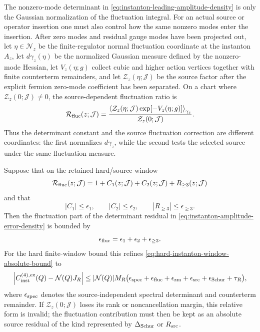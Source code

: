 \begin{controlledapproximation}
\label{ca:instanton-source-fluctuation-cumulant-bound}
The nonzero-mode determinant in
\eqref{eq:instanton-leading-amplitude-density} is only the Gaussian
normalization of the fluctuation integral.  For an actual source or operator
insertion one must also control how the same nonzero modes enter the insertion.
After zero modes and residual gauge modes have been projected out, let
\(\eta\in\mathcal N_z\) be the finite-regulator normal fluctuation coordinate
at the instanton \(A_z\), let \(d\gamma_z(\eta)\) be the normalized Gaussian
measure defined by the nonzero-mode Hessian, let \(V_z(\eta;g)\) collect cubic
and higher action vertices together with finite counterterm remainders, and let
\(\mathcal Z_z(\eta;\mathcal J)\) be the source factor after the explicit
fermion zero-mode coefficient has been separated.  On a chart where
\(\mathcal Z_z(0;\mathcal J)\ne0\), the source-dependent fluctuation ratio is
\[
  \mathcal R_{\rm fluc}(z;\mathcal J)
  =
  \frac{
    \left\langle
      \mathcal Z_z(\eta;\mathcal J)
      \exp[-V_z(\eta;g)]
    \right\rangle_{\gamma_z}
  }{
    \mathcal Z_z(0;\mathcal J)
  } .
\]
Thus the determinant constant and the source fluctuation correction are
different coordinates: the first normalizes \(d\gamma_z\), while the second
tests the selected source under the same fluctuation measure.

Suppose that on the retained hard/source window
\[
  \mathcal R_{\rm fluc}(z;\mathcal J)
  =
  1+C_1(z;\mathcal J)+C_2(z;\mathcal J)+R_{\ge3}(z;\mathcal J)
\]
and that
\[
  |C_1|\le\epsilon_1,\qquad
  |C_2|\le\epsilon_2,\qquad
  |R_{\ge3}|\le\epsilon_{\ge3}.
\]
Then the fluctuation part of the determinant residual in
\eqref{eq:instanton-amplitude-error-density} is bounded by
\[
  \epsilon_{\rm fluc}
  =
  \epsilon_1+\epsilon_2+\epsilon_{\ge3}.
\]
For the hard finite-window bound this refines
\eqref{eq:hard-instanton-window-absolute-bound} to
\[
  \left|
  C_{\rm inst}^{(4),{\rm ex}}(Q)-\mathcal N(Q)J_R
  \right|
  \le
  |\mathcal N(Q)|M_R
  \bigl(
    \epsilon_{\rm spec}
    +\epsilon_{\rm fluc}
    +\epsilon_{\rm zm}
    +\epsilon_{\rm src}
    +\epsilon_{\rm Schur}
    +\tau_R
  \bigr),
\]
where \(\epsilon_{\rm spec}\) denotes the source-independent spectral
determinant and counterterm remainder.  If
\(\mathcal Z_z(0;\mathcal J)\) loses its rank or noncancellation margin, this
relative form is invalid; the fluctuation contribution must then be kept as an
absolute source residual of the kind represented by \(\Delta_{\rm Schur}\) or
\(R_{\rm src}\).


\end{controlledapproximation}
